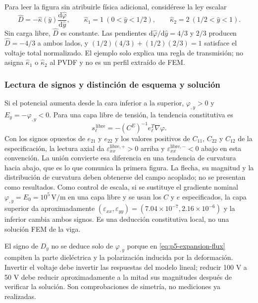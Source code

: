 Para leer la figura sin atribuirle física adicional, considérese la ley
escalar
\begin{equation}
  \hat D=-\hat\kappa(\hat y)\frac{\mathrm d\hat\varphi}{\mathrm d\hat y},
  \qquad
  \hat\kappa_1=1\ (0<\hat y<1/2),\qquad
  \hat\kappa_2=2\ (1/2<\hat y<1).
  \label{eq:p5-expansion-didactic-interface}
\end{equation}
Sin carga libre, $\hat D$ es constante. Las pendientes
$\mathrm d\hat\varphi/\mathrm d\hat y=4/3$ y $2/3$ producen
$\hat D=-4/3$ a ambos lados, y
$(1/2)(4/3)+(1/2)(2/3)=1$ satisface el voltaje total normalizado. El ejemplo
solo explica una regla de transmisión; no asigna $\hat\kappa_1$ o
$\hat\kappa_2$ al PVDF y no es un perfil extraído de FEM.

\subsubsection{Lectura de signos y distinción de esquema y solución}

Si el potencial aumenta desde la cara inferior a la superior,
$\varphi_{,y}>0$ y $E_y=-\varphi_{,y}<0$. Para una capa libre de tensión,
la tendencia constitutiva es
\begin{equation}
  s_\ell^{\,\mathrm{libre}}=-(C^E)^{-1}e_\ell^T\nabla\varphi.
  \label{eq:p5-expansion-free-strain}
\end{equation}
Con los signos opuestos de $e_{21}$ y $e_{22}$ y los valores positivos de
$C_{11}$, $C_{22}$ y $C_{12}$ de la especificación, la lectura axial da
$\varepsilon_{xx}^{\mathrm{libre},+}>0$ arriba y
$\varepsilon_{xx}^{\mathrm{libre},-}<0$ abajo en esta convención. La unión
convierte esa diferencia en una tendencia de curvatura hacia abajo, que es lo
que comunica la primera figura. La flecha, su magnitud y la distribución de
curvatura deben obtenerse del campo acoplado; no se presentan como resultados.
Como control de escala, si se sustituye el gradiente nominal
$\varphi_{,y}=E_0=10^5\,\mathrm{V}/\mathrm{m}$ en una capa libre y se usan
los $C$ y $e$ especificados, la capa superior da aproximadamente
$(\varepsilon_{xx},\varepsilon_{yy})=(7.04\times10^{-7},
2.16\times10^{-6})$ y la inferior cambia ambos signos. Es una deducción
constitutiva local, no una solución FEM de la viga.

El signo de $D_y$ no se deduce solo de $\varphi_{,y}$ porque en
\eqref{eq:p5-expansion-flux} compiten la parte dieléctrica y la polarización
inducida por la deformación. Invertir el voltaje debe invertir las respuestas
del modelo lineal; reducir 100 V a 50 V debe reducir aproximadamente a la
mitad sus magnitudes después de verificar la solución. Son comprobaciones de
simetría, no mediciones ya realizadas.
